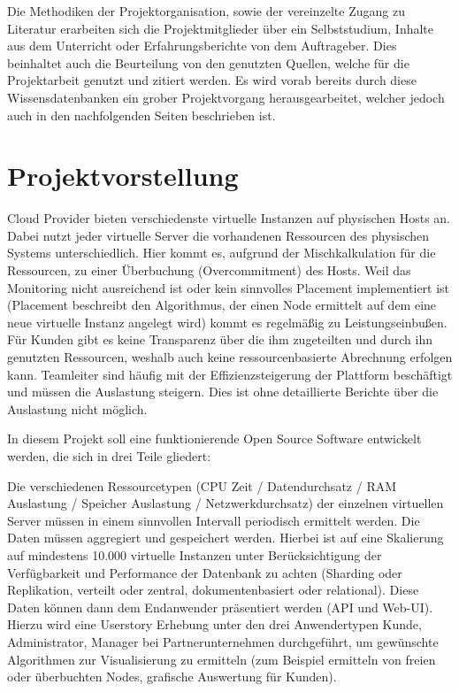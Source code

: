 Die Methodiken der Projektorganisation, sowie der vereinzelte Zugang zu
Literatur erarbeiten sich die Projektmitglieder über ein Selbststudium, Inhalte
aus dem Unterricht oder Erfahrungsberichte von dem Auftrageber. Dies
beinhaltet auch die Beurteilung von den genutzten Quellen, welche für die
Projektarbeit genutzt und zitiert werden. Es wird vorab bereits durch diese
Wissensdatenbanken ein grober Projektvorgang herausgearbeitet, welcher jedoch
auch in den nachfolgenden Seiten beschrieben ist.
\all%

\chapter{Projektvorstellung}
\label{subsec:projektvorstellung}
Cloud Provider bieten verschiedenste virtuelle Instanzen auf physischen Hosts
an. Dabei nutzt jeder virtuelle Server die vorhandenen Ressourcen des
physischen Systems unterschiedlich. Hier kommt es, aufgrund der
Mischkalkulation für die Ressourcen, zu einer Überbuchung (Overcommitment) des
Hosts. Weil das Monitoring nicht ausreichend ist oder kein sinnvolles Placement
implementiert ist (Placement beschreibt den Algorithmus, der einen Node
ermittelt auf dem eine neue virtuelle Instanz angelegt wird) kommt es
regelmäßig zu Leistungseinbußen. Für Kunden gibt es keine Transparenz über die
ihm zugeteilten und durch ihn genutzten Ressourcen, weshalb auch keine
ressourcenbasierte Abrechnung erfolgen kann. Teamleiter sind häufig mit der
Effizienzsteigerung der Plattform beschäftigt und müssen die Auslastung
steigern. Dies ist ohne detaillierte Berichte über die Auslastung nicht
möglich.

In diesem Projekt soll eine funktionierende Open Source Software entwickelt
werden, die sich in drei Teile gliedert:

\begin{outline}
  \1 Die verschiedenen Ressourcetypen (CPU Zeit / Datendurchsatz / RAM
  Auslastung / Speicher Auslastung / Netzwerkdurchsatz) der einzelnen
  virtuellen Server müssen in einem sinnvollen Intervall periodisch ermittelt
  werden.
  \1 Die Daten müssen aggregiert und gespeichert werden. Hierbei ist auf eine
  Skalierung auf mindestens 10.000 virtuelle Instanzen unter Berücksichtigung
  der Verfügbarkeit und Performance der Datenbank zu achten (Sharding oder
  Replikation, verteilt oder zentral, dokumentenbasiert oder relational).
  \1 Diese Daten können dann dem Endanwender präsentiert werden (\gls{API} und
  Web-UI). Hierzu wird eine Userstory Erhebung unter den drei Anwendertypen
  Kunde, Administrator, Manager bei Partnerunternehmen durchgeführt, um
  gewünschte Algorithmen zur Visualisierung zu ermitteln (zum Beispiel
  ermitteln von freien oder überbuchten Nodes, grafische Auswertung für Kunden).
\end{outline}

